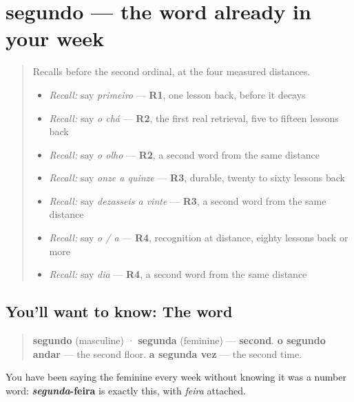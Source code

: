 \section[segundo / segunda]{segundo — the word already in your week}

\label{lesson:PT-C27-segundo}



\begin{quote}
Recalls before the second ordinal, at the four measured distances.

\begin{itemize}
\raggedright
  \item \emph{Recall:} say \emph{primeiro} — \textbf{R1}, one lesson back, before it decays
  \item \emph{Recall:} say \emph{o chá} — \textbf{R2}, the first real retrieval, five to fifteen lessons back
  \item \emph{Recall:} say \emph{o olho} — \textbf{R2}, a second word from the same distance
  \item \emph{Recall:} say \emph{onze a quinze} — \textbf{R3}, durable, twenty to sixty lessons back
  \item \emph{Recall:} say \emph{dezasseis a vinte} — \textbf{R3}, a second word from the same distance
  \item \emph{Recall:} say \emph{o / a} — \textbf{R4}, recognition at distance, eighty lessons back or more
  \item \emph{Recall:} say \emph{dia} — \textbf{R4}, a second word from the same distance
\end{itemize}
\end{quote}

\subsection*{You'll want to know: The word}
\begin{quote}
\textbf{segundo} (masculine) · \textbf{segunda} (feminine) — \textbf{second}. \textbf{o segundo andar} — the second floor. \textbf{a segunda vez} — the second time.
\end{quote}

You have been saying the feminine every week without knowing it was a number word: \textbf{\emph{segunda}-feira} is exactly this, with \emph{feira} attached.

